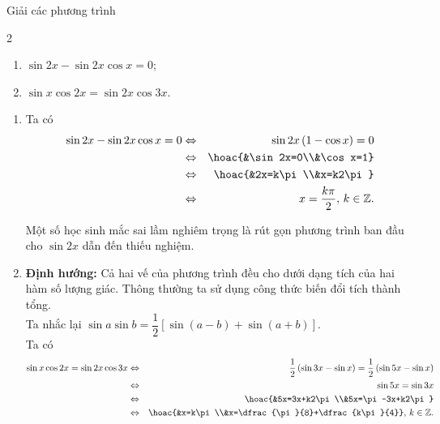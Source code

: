 \begin{vd}%
	Giải các phương trình
	\begin{multicols}{2}
		\begin{enumerate}
			\item $\sin 2x-\sin 2x\cos x=0$;
			\item $\sin x\cos 2x=\sin 2x\cos 3x$.
		\end{enumerate}
	\end{multicols}
	\loigiai 
	{
		\begin{enumerate}
			\item Ta có
			\allowdisplaybreaks
			\begin{eqnarray*}
				\sin 2x-\sin 2x\cos x=0&\Leftrightarrow&\sin 2x\left(1-\cos x\right)=0\\
				&\Leftrightarrow&\hoac{&\sin 2x=0\\&\cos x=1}\\
				&\Leftrightarrow&\hoac{&2x=k\pi\\&x=k2\pi}\\
				&\Leftrightarrow& x=\dfrac{k\pi}{2},\, k\in\mathbb{Z}.
			\end{eqnarray*}
		\begin{luuy}
			Một số học sinh mắc sai lầm nghiêm trọng là rút gọn phương trình ban đầu cho $\sin 2x$ dẫn đến thiếu nghiệm.
		\end{luuy}
			\item \textbf{Định hướng:} Cả hai vế của phương trình đều cho dưới dạng tích của hai hàm số lượng giác. Thông thường ta sử dụng công thức biến đổi tích thành tổng.\\
			Ta nhắc lại $\sin a\sin b=\dfrac{1}{2}\left[\sin (a-b)+\sin(a+b)\right]$.\\
			Ta có
			\allowdisplaybreaks
			\begin{eqnarray*}
				\sin x\cos 2x=\sin 2x\cos 3x&\Leftrightarrow&\dfrac{1}{2}\left(\sin 3x-\sin x\right)=\dfrac{1}{2}\left(\sin 5x-\sin x\right)\\
				&\Leftrightarrow&\sin 5x=\sin 3x\\
				&\Leftrightarrow& \hoac{&5x=3x+k2\pi\\&5x=\pi-3x+k2\pi}\\
				&\Leftrightarrow&\hoac{&x=k\pi\\&x=\dfrac{\pi}{8}+\dfrac{k\pi}{4}},\, k\in\mathbb{Z}.
			\end{eqnarray*}
		\end{enumerate}
	}
\end{vd}

